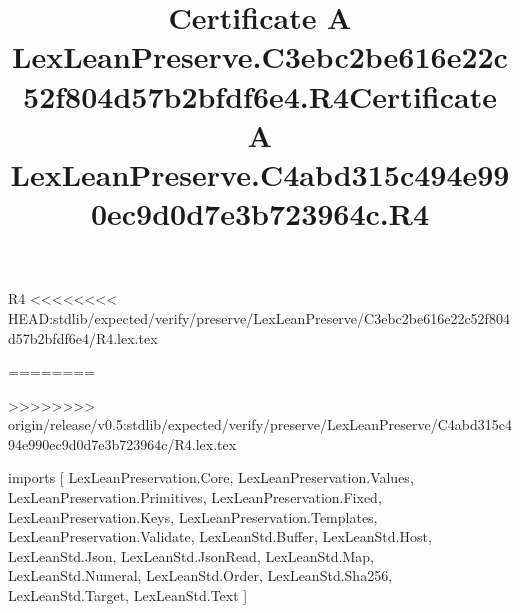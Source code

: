 \begin{lexlean}{R4}
<<<<<<<< HEAD:stdlib/expected/verify/preserve/LexLeanPreserve/C3ebc2be616e22c52f804d57b2bfdf6e4/R4.lex.tex
\title{Certificate A LexLeanPreserve.C3ebc2be616e22c52f804d57b2bfdf6e4.R4}
========
\title{Certificate A LexLeanPreserve.C4abd315c494e990ec9d0d7e3b723964c.R4}
>>>>>>>> origin/release/v0.5:stdlib/expected/verify/preserve/LexLeanPreserve/C4abd315c494e990ec9d0d7e3b723964c/R4.lex.tex
\begin{coremodule}
imports [
  LexLeanPreservation.Core,
  LexLeanPreservation.Values,
  LexLeanPreservation.Primitives,
  LexLeanPreservation.Fixed,
  LexLeanPreservation.Keys,
  LexLeanPreservation.Templates,
  LexLeanPreservation.Validate,
  LexLeanStd.Buffer,
  LexLeanStd.Host,
  LexLeanStd.Json,
  LexLeanStd.JsonRead,
  LexLeanStd.Map,
  LexLeanStd.Numeral,
  LexLeanStd.Order,
  LexLeanStd.Sha256,
  LexLeanStd.Target,
  LexLeanStd.Text
]


\end{coremodule}
\end{lexlean}
